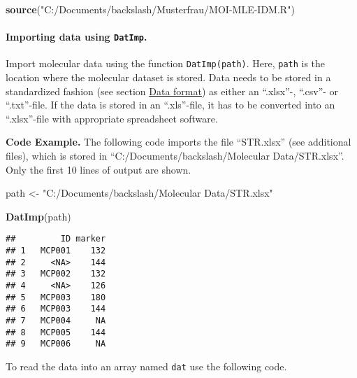 \documentclass[
]{article}
\newenvironment{Shaded}{\begin{snugshade}}{\end{snugshade}}
\newcommand{\FunctionTok}[1]{\textcolor[rgb]{0.13,0.29,0.53}{\textbf{#1}}}
\newcommand{\NormalTok}[1]{#1}
\newcommand{\OtherTok}[1]{\textcolor[rgb]{0.56,0.35,0.01}{#1}}
\newcommand{\StringTok}[1]{\textcolor[rgb]{0.31,0.60,0.02}{#1}}
\begin{document}
\begin{Shaded}
\begin{Highlighting}[]
\FunctionTok{source}\NormalTok{(}\StringTok{"C:/Documents/backslash/Musterfrau/MOI{-}MLE{-}IDM.R"}\NormalTok{)}
\end{Highlighting}
\end{Shaded}

\hypertarget{importing-data-using-datimp.}{%
\paragraph{\texorpdfstring{Importing data using
\texttt{DatImp}.}{Importing data using DatImp.}}\label{importing-data-using-datimp.}}

Import molecular data using the function \texttt{DatImp(path)}. Here,
\texttt{path} is the location where the molecular dataset is stored.
Data needs to be stored in a standardized fashion (see section
\href{datform}{Data format}) as either an ``.xlsx''-, ``.csv''- or
``.txt''-file. If the data is stored in an ``.xls''-file, it has to be
converted into an ``.xlsx''-file with appropriate spreadsheet software.

\textbf{Code Example.} The following code imports the file ``STR.xlsx''
(see additional files), which is stored in
``C:/Documents/backslash/Molecular Data/STR.xlsx''. Only the first 10
lines of output are shown.

\begin{Shaded}
\begin{Highlighting}[]
\NormalTok{path }\OtherTok{\textless{}{-}} \StringTok{"C:/Documents/backslash/Molecular Data/STR.xlsx"}
\end{Highlighting}
\end{Shaded}

\begin{Shaded}
\begin{Highlighting}[]
\FunctionTok{DatImp}\NormalTok{(path)}
\end{Highlighting}
\end{Shaded}

\begin{verbatim}
##         ID marker
## 1   MCP001    132
## 2     <NA>    144
## 3   MCP002    132
## 4     <NA>    126
## 5   MCP003    180
## 6   MCP003    144
## 7   MCP004     NA
## 8   MCP005    144
## 9   MCP006     NA
\end{verbatim}

To read the data into an array named \texttt{dat} use the following
code.
\end{document}
